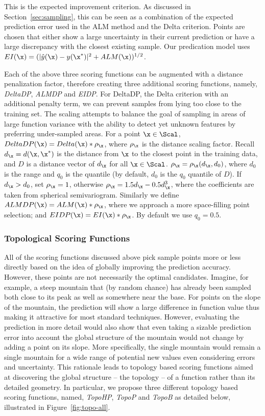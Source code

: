  This is the expected improvement criterion.
%
As discussed in Section~\ref{sec:sampling}, this can be seen as a combination of the expected prediction error used in the ALM method and the Delta criterion.
%
Points are chosen that either show a large uncertainty in their current prediction or have a large discrepancy with the closest existing sample.
%
Our predication model uses $EI(\x) = (|\hat{y}(\x) - y(\x^*)|^2+ ALM(\x))^{1/2}$.

 Each of the above three scoring functions can be augmented with a distance penalization factor, therefore creating three additional scoring functions, namely, \emph{DeltaDP}, \emph{ALMDP} and \emph{EIDP}.
%
For DeltaDP, the Delta criterion with an additional penalty term, we can prevent samples from lying too close to the training set.
%
The scaling attempts to balance the goal of sampling in areas of large function variance with the ability to detect yet unknown features by preferring under-sampled areas.
%
For a point $\x \in \Scal$, $DeltaDP(\x) = Delta(\x) * \rho_\x$, where $\rho_\x$ is the distance scaling factor.
%
Recall $d_\x = d(\x,\x^*)$ is the distance from $\x$ to the closest point in the training data, and $D$ is a distance vector of $d_\x$ for all $\x \in \Scal$.
%
$\rho_\x = \rho_\x (d_\x, d_0)$, where $d_0$ is the range and $q_0$ is the quantile (by default, $d_0$ is the $q_0$ quantile of $D$).
%
If $d_\x>d_0$, set $\rho_\x = 1$, otherwise $\rho_\x = 1.5d_\x-0.5d_\x^3$, where the coefficients are taken from spherical semivariogram.
%
Similarly we define $ALMDP(\x) = ALM(\x) * \rho_\x$, where we approach a more space-filling point selection; and $EIDP(\x) = EI(\x) * \rho_\x$.  By default we use $q_0 = 0.5$.


\subsubsection{Topological Scoring Functions}
\label{sec:toposcoring}
All of the scoring functions discussed above pick sample points more or less directly based on the idea of globally improving the prediction accuracy.
%
However, these points are not necessarily the optimal candidates.
%
Imagine, for example, a steep mountain that (by random chance) has already been sampled both close to its peak as well as somewhere near the base.
%
For points on the slope of the mountain, the prediction will show a large difference in function value thus
making it attractive for most standard techniques.
%
However, evaluating the prediction in more detail would also show that even taking a sizable prediction error into account the global structure of the mountain would not change by adding a point on its slope.
%
More specifically, the single mountain would remain a single mountain for a wide range of potential new values even considering errors and uncertainty.
%
This rationale leads to topology based scoring functions aimed at discovering the global structure -- the topology -- of a function rather than its detailed geometry.
%
In particular, we propose three different topology based scoring functions, named, \emph{TopoHP}, \emph{TopoP} and \emph{TopoB} as detailed below, illustrated in Figure~\ref{fig:topo-all}.


